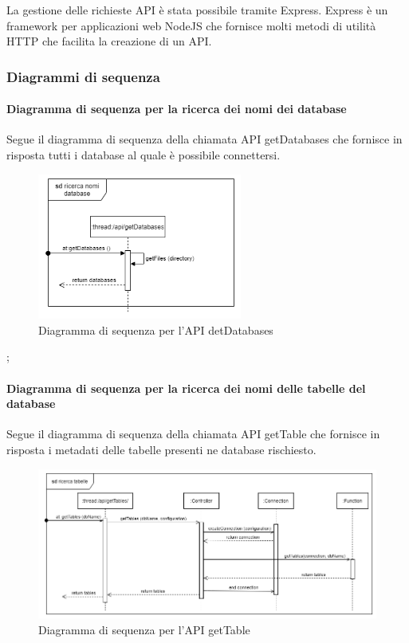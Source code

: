     La gestione delle richieste API è stata possibile tramite Express. Express è un framework per applicazioni web NodeJS che fornisce molti metodi di utilità HTTP che facilita la creazione di un API.
    
    \subsubsection{Diagrammi di sequenza}
    
    \paragraph{Diagramma di sequenza per la ricerca dei nomi dei database}
     Segue il diagramma di sequenza della chiamata API getDatabases che fornisce in risposta tutti i database al quale è possibile connettersi.
            \begin{figure}[H]
                \centering\includegraphics[width=0.6\textwidth]{source/img/API_getDatabases.png}
                \caption{Diagramma di sequenza per l'API detDatabases}
            \end{figure}
            \pagebreak;
            
    \paragraph{Diagramma di sequenza per la ricerca dei nomi delle tabelle del database}
        Segue il diagramma di sequenza della chiamata API getTable che fornisce in risposta i metadati delle tabelle presenti ne database rischiesto.
            \begin{figure}[H]
                \centering\includegraphics[width=1\textwidth]{source/img/API_getTable.png}
                \caption{Diagramma di sequenza per l'API getTable}
            \end{figure}
            
